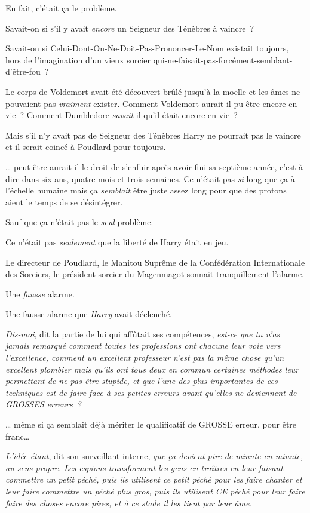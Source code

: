 En fait, c'était ça le problème.

Savait-on si s'il y avait \emph{encore} un Seigneur des Ténèbres à vaincre~?

Savait-on si Celui-Dont-On-Ne-Doit-Pas-Prononcer-Le-Nom existait toujours, hors de l'imagination d'un vieux sorcier qui-ne-faisait-pas-forcément-semblant-d'être-fou~?

Le corps de Voldemort avait été découvert brûlé jusqu'à la moelle et les âmes ne pouvaient pas \emph{vraiment} exister. Comment Voldemort aurait-il pu être encore en vie~? Comment Dumbledore \emph{savait}-il qu'il était encore en vie~?

Mais s'il n'y avait pas de Seigneur des Ténèbres Harry ne pourrait pas le vaincre et il serait coincé à Poudlard pour toujours.

… peut-être aurait-il le droit de s'enfuir après avoir fini sa septième année, c'est-à-dire dans six ans, quatre mois et trois semaines. Ce n'était pas \emph{si} long que ça à l'échelle humaine mais ça \emph{semblait} être juste assez long pour que des protons aient le temps de se désintégrer.

Sauf que ça n'était pas le \emph{seul} problème.

Ce n'était pas \emph{seulement} que la liberté de Harry était en jeu.

Le directeur de Poudlard, le Manitou Suprême de la Confédération Internationale des Sorciers, le président sorcier du Magenmagot sonnait tranquillement l'alarme.

Une \emph{fausse} alarme.

Une fausse alarme que \emph{Harry} avait déclenché.

\emph{Dis-moi}, dit la partie de lui qui affûtait ses compétences, \emph{est-ce que tu n'as jamais remarqué comment toutes les professions ont chacune leur voie vers l'excellence, comment un excellent professeur n'est pas la même chose qu'un excellent plombier mais qu'ils ont tous deux en commun certaines méthodes leur permettant de ne pas être stupide, et que l'une des plus importantes de ces techniques est de faire face à ses petites erreurs avant qu'elles ne deviennent de GROSSES erreurs~?}

… même si ça semblait déjà mériter le qualificatif de GROSSE erreur, pour être franc…

\emph{L'idée étant}, dit son surveillant interne, \emph{que ça devient pire de minute en minute, au sens propre. Les espions transforment les gens en traîtres en leur faisant commettre un petit péché, puis ils utilisent ce petit péché pour les faire chanter et leur faire commettre un péché plus gros, puis ils utilisent CE péché pour leur faire faire des choses encore pires, et à ce stade il les tient par leur âme.}

